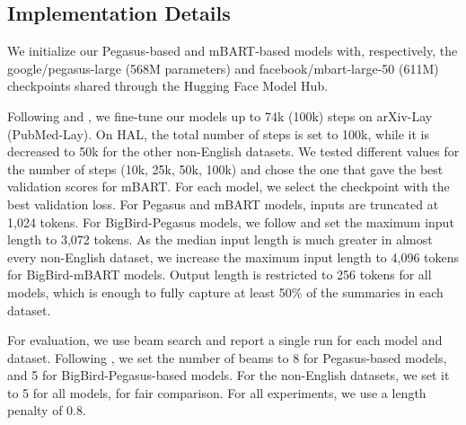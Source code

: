 

\subsection{Implementation Details}

We initialize our Pegasus-based and mBART-based models with, respectively, the google/pegasus-large (568M parameters) and facebook/mbart-large-50 (611M) checkpoints shared through the Hugging Face Model Hub. 

Following \citet{zhang2020pegasus} and \citet{zaheer2020big}, we fine-tune our models up to 74k (100k) steps on arXiv-Lay (PubMed-Lay). On HAL, the total number of steps is set to 100k, while it is decreased to 50k for the other non-English datasets. We tested different values for the number of steps (10k, 25k, 50k, 100k) and chose the one that gave the best validation scores for mBART.
For each model, we select the checkpoint with the best validation loss. For Pegasus and mBART models, inputs are truncated at 1,024 tokens. For BigBird-Pegasus models, we follow \citet{zaheer2020big} and set the maximum input length to 3,072 tokens. As the median input length is much greater in almost every non-English dataset, we increase the maximum input length to 4,096 tokens for BigBird-mBART models. Output length is restricted to 256 tokens for all models, which is enough to fully capture at least 50\% of the summaries in each dataset.

For evaluation, we use beam search and report a single run for each model and dataset. Following \citet{zhang2020pegasus, zaheer2020big}, we set the number of beams to 8 for Pegasus-based models, and 5 for BigBird-Pegasus-based models. For the non-English datasets, we set it to 5 for all models, for fair comparison. For all experiments, we use a length penalty of 0.8. 

